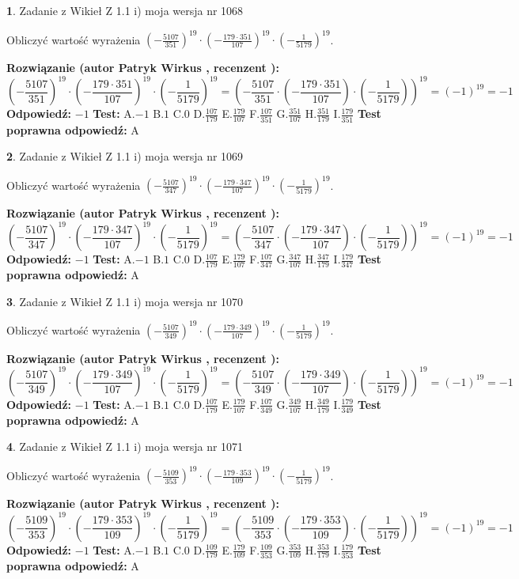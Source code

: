 \documentclass[12pt, a4paper]{article}
\theoremstyle{definition} %
\newtheorem{zad}{}
\newcommand{\zadStart}[1]{\begin{zad}#1\newline}
\newcommand{\zadStop}{\end{zad}}
\newcommand{\rozwStart}[2]{\noindent \textbf{Rozwiązanie (autor #1 , recenzent #2): }\newline}
\newcommand{\rozwStop}{\newline}
\newcommand{\odpStart}{\noindent \textbf{Odpowiedź:}\newline}
\newcommand{\odpStop}{\newline}
\newcommand{\testStart}{\noindent \textbf{Test:}\newline}
\newcommand{\testStop}{\newline}
\newcommand{\kluczStart}{\noindent \textbf{Test poprawna odpowiedź:}\newline}
\newcommand{\kluczStop}{\newline}
\begin{document}
\zadStart{Zadanie z Wikieł Z 1.1 i) moja wersja nr 1068}

Obliczyć wartość wyrażenia $(-\frac{5107}{351})^{19} \cdot (-\frac{179 \cdot 351}{107})^{19} \cdot (-\frac{1}{5179})^{19}$.
\zadStop
\rozwStart{Patryk Wirkus}{}
$$(-\frac{5107}{351})^{19} \cdot (-\frac{179 \cdot 351}{107})^{19} \cdot (-\frac{1}{5179})^{19} = (-\frac{5107}{351} \cdot (-\frac{179 \cdot 351}{107}) \cdot (-\frac{1}{5179}))^{19} = (-1)^{19} = -1$$
\rozwStop
\odpStart
$-1$
\odpStop
\testStart
A.$-1$ B.$1$ C.$0$ D.$\frac{107}{179}$ E.$\frac{179}{107}$
F.$\frac{107}{351}$ G.$\frac{351}{107}$
H.$\frac{351}{179}$
I.$\frac{179}{351}$
\testStop
\kluczStart
A
\kluczStop



\zadStart{Zadanie z Wikieł Z 1.1 i) moja wersja nr 1069}

Obliczyć wartość wyrażenia $(-\frac{5107}{347})^{19} \cdot (-\frac{179 \cdot 347}{107})^{19} \cdot (-\frac{1}{5179})^{19}$.
\zadStop
\rozwStart{Patryk Wirkus}{}
$$(-\frac{5107}{347})^{19} \cdot (-\frac{179 \cdot 347}{107})^{19} \cdot (-\frac{1}{5179})^{19} = (-\frac{5107}{347} \cdot (-\frac{179 \cdot 347}{107}) \cdot (-\frac{1}{5179}))^{19} = (-1)^{19} = -1$$
\rozwStop
\odpStart
$-1$
\odpStop
\testStart
A.$-1$ B.$1$ C.$0$ D.$\frac{107}{179}$ E.$\frac{179}{107}$
F.$\frac{107}{347}$ G.$\frac{347}{107}$
H.$\frac{347}{179}$
I.$\frac{179}{347}$
\testStop
\kluczStart
A
\kluczStop



\zadStart{Zadanie z Wikieł Z 1.1 i) moja wersja nr 1070}

Obliczyć wartość wyrażenia $(-\frac{5107}{349})^{19} \cdot (-\frac{179 \cdot 349}{107})^{19} \cdot (-\frac{1}{5179})^{19}$.
\zadStop
\rozwStart{Patryk Wirkus}{}
$$(-\frac{5107}{349})^{19} \cdot (-\frac{179 \cdot 349}{107})^{19} \cdot (-\frac{1}{5179})^{19} = (-\frac{5107}{349} \cdot (-\frac{179 \cdot 349}{107}) \cdot (-\frac{1}{5179}))^{19} = (-1)^{19} = -1$$
\rozwStop
\odpStart
$-1$
\odpStop
\testStart
A.$-1$ B.$1$ C.$0$ D.$\frac{107}{179}$ E.$\frac{179}{107}$
F.$\frac{107}{349}$ G.$\frac{349}{107}$
H.$\frac{349}{179}$
I.$\frac{179}{349}$
\testStop
\kluczStart
A
\kluczStop



\zadStart{Zadanie z Wikieł Z 1.1 i) moja wersja nr 1071}

Obliczyć wartość wyrażenia $(-\frac{5109}{353})^{19} \cdot (-\frac{179 \cdot 353}{109})^{19} \cdot (-\frac{1}{5179})^{19}$.
\zadStop
\rozwStart{Patryk Wirkus}{}
$$(-\frac{5109}{353})^{19} \cdot (-\frac{179 \cdot 353}{109})^{19} \cdot (-\frac{1}{5179})^{19} = (-\frac{5109}{353} \cdot (-\frac{179 \cdot 353}{109}) \cdot (-\frac{1}{5179}))^{19} = (-1)^{19} = -1$$
\rozwStop
\odpStart
$-1$
\odpStop
\testStart
A.$-1$ B.$1$ C.$0$ D.$\frac{109}{179}$ E.$\frac{179}{109}$
F.$\frac{109}{353}$ G.$\frac{353}{109}$
H.$\frac{353}{179}$
I.$\frac{179}{353}$
\testStop
\kluczStart
A
\kluczStop
\end{document}
